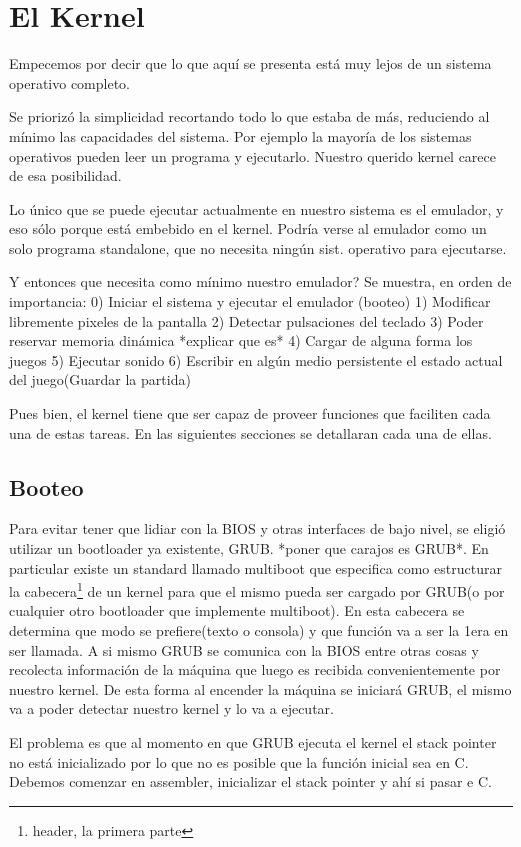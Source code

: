 \chapter{El Kernel}

Empecemos por decir que lo que aquí se presenta está muy lejos de un sistema operativo completo.

Se priorizó la simplicidad recortando todo lo que estaba de más, reduciendo al mínimo las capacidades del sistema. Por ejemplo la mayoría de los sistemas operativos pueden leer un programa y ejecutarlo. Nuestro querido kernel carece de esa posibilidad.

Lo único que se puede ejecutar actualmente en nuestro sistema es el emulador, y eso sólo porque está embebido en el kernel. Podría verse al emulador como un solo programa standalone, que no necesita ningún sist. operativo para ejecutarse.

Y entonces que necesita como mínimo nuestro emulador? Se muestra, en orden de importancia:
0) Iniciar el sistema y ejecutar el emulador (booteo)
1) Modificar libremente pixeles de la pantalla
2) Detectar pulsaciones del teclado
3) Poder reservar memoria dinámica *explicar que es*
4) Cargar de alguna forma los juegos
5) Ejecutar sonido
6) Escribir en algún medio persistente el estado actual del juego(Guardar la partida)

Pues bien, el kernel tiene que ser capaz de proveer funciones que faciliten cada una de estas tareas. En las siguientes secciones se detallaran cada una de ellas.

\section{Booteo}
Para evitar tener que lidiar con la BIOS y otras interfaces de bajo nivel, se eligió utilizar un bootloader ya existente, GRUB. *poner que carajos es GRUB*. En particular existe un standard llamado multiboot que especifica como estructurar la cabecera\footnote{header, la primera parte} de un kernel para que el mismo pueda ser cargado por GRUB(o por cualquier otro bootloader que implemente multiboot). En esta cabecera se determina que modo se prefiere(texto o consola) y que función va a ser la 1era en ser llamada. A si mismo GRUB se comunica con la BIOS entre otras cosas y recolecta información de la máquina que luego es recibida convenientemente por nuestro kernel. De esta forma al encender la máquina se iniciará GRUB, el mismo va a poder detectar nuestro kernel y lo va a ejecutar.


El problema es que al momento en que GRUB ejecuta el kernel el stack pointer no está inicializado por lo que no es posible que la función inicial sea en C. Debemos comenzar en assembler, inicializar el stack pointer y ahí si pasar e C.